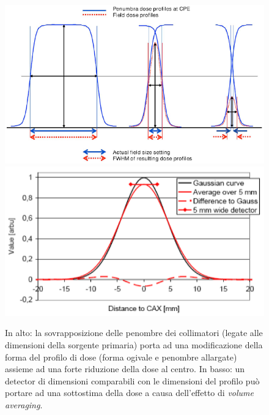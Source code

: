 \begin{figure}[!t]
\centering
\includegraphics[width=.7\textwidth]{./cap2/small_eff1.png}
\includegraphics[width=.7\textwidth]{./cap2/small_eff2.png}
\caption{In alto: la sovrapposizione delle penombre dei collimatori (legate alle dimensioni della sorgente primaria) porta ad una modificazione della forma del profilo di dose (forma ogivale e penombre allargate) assieme ad una forte riduzione della dose al centro. In basso: un detector di dimensioni comparabili con le dimensioni del profilo può portare ad una sottostima della dose a causa dell'effetto di \textit{volume averaging}.}
\label{fig:small_eff}
\end{figure}


